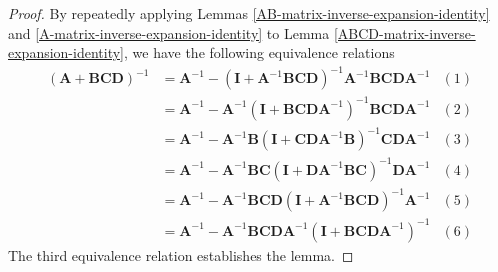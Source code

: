 \begin{proof}
By repeatedly applying Lemmas \ref{AB-matrix-inverse-expansion-identity}
and \ref{A-matrix-inverse-expansion-identity}
to Lemma \ref{ABCD-matrix-inverse-expansion-identity}, we have the following equivalence relations
\begin{equation*}
    \begin{aligned}
        \left( \mathbf{A} + \mathbf{B} \mathbf{C} \mathbf{D} \right)^{-1}
        &= \mathbf{A}^{-1} - \left( \mathbf{I} + \mathbf{A}^{-1}\mathbf{B} \mathbf{C} \mathbf{D} \right)^{-1} \mathbf{A}^{-1} \mathbf{B} \mathbf{C} \mathbf{D} \mathbf{A}^{-1}
        & (1) \\
        &= \mathbf{A}^{-1} - \mathbf{A}^{-1} \left( \mathbf{I} + \mathbf{B} \mathbf{C} \mathbf{D} \mathbf{A}^{-1} \right)^{-1} \mathbf{B} \mathbf{C} \mathbf{D} \mathbf{A}^{-1}
        & (2) \\
        &= \mathbf{A}^{-1} - \mathbf{A}^{-1} \mathbf{B} \left( \mathbf{I} + \mathbf{C} \mathbf{D} \mathbf{A}^{-1} \mathbf{B} \right)^{-1} \mathbf{C} \mathbf{D} \mathbf{A}^{-1}
        & (3) \\
        &= \mathbf{A}^{-1} - \mathbf{A}^{-1} \mathbf{B} \mathbf{C} \left( \mathbf{I} + \mathbf{D} \mathbf{A}^{-1} \mathbf{B} \mathbf{C} \right)^{-1} \mathbf{D} \mathbf{A}^{-1}
        & (4) \\
        &= \mathbf{A}^{-1} - \mathbf{A}^{-1} \mathbf{B} \mathbf{C} \mathbf{D} \left( \mathbf{I} + \mathbf{A}^{-1} \mathbf{B} \mathbf{C} \mathbf{D} \right)^{-1} \mathbf{A}^{-1}
        & (5) \\
        &= \mathbf{A}^{-1} - \mathbf{A}^{-1} \mathbf{B} \mathbf{C} \mathbf{D} \mathbf{A}^{-1} \left( \mathbf{I} + \mathbf{B} \mathbf{C} \mathbf{D} \mathbf{A}^{-1} \right)^{-1}
        & (6)
    \end{aligned}
\end{equation*}
The third equivalence relation establishes the lemma.
\end{proof}


